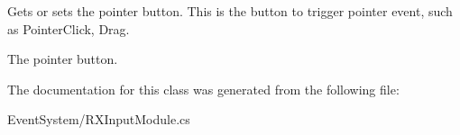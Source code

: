 Gets or sets the pointer button. This is the button to trigger pointer event, such as Pointer\+Click, Drag. 

The pointer button.

The documentation for this class was generated from the following file\+:\begin{DoxyCompactItemize}
\item 
Event\+System/R\+X\+Input\+Module.\+cs\end{DoxyCompactItemize}
